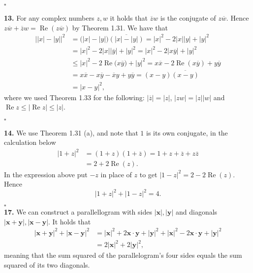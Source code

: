 \documentclass[11pt]{article}
\DeclareMathOperator{\VarRe}{Re}
\begin{document}
\hfill$\square$

\noindent\textbf{13.} For any complex numbers $z, w$ it holds that $\overline{z}w$ is the conjugate of $z\overline{w}$.
Hence $z\overline{w} + \overline{z}w = \VarRe{(z\overline{w})}$ by Theorem 1.31.
We have that
\begin{align*}
  \big| |x| - |y| \big|^2 & =    \big( |x| - |y|\big) \overline{ (|x| - |y| )}
                            =    |x|^2 - 2|x||y| + |y|^2 \\
                          & =    |x|^2 - 2|x||\overline{y}| + |y|^2
                            =    |x|^2 - 2|x\overline{y}| + |y|^2\\
                          & \leq |x|^2 - 2\VarRe{(x\overline{y}}) + |y|^2
                            =    x\overline{x} - 2\VarRe{(x\overline{y})} + y\overline{y} \\
                          & =    x\overline{x} - x\overline{y} - \overline{x}y + y\overline{y}
                            =    (x - y)\overline{(x-y)} \\
                          & =    | x - y |^2,
\end{align*}
where we used Theorem 1.33 for the following: $|\overline{z}| = |z|$, $|zw| = |z||w|$
and $\VarRe{z} \leq |\VarRe{z}| \leq |z|$.

\hfill$\square$


\noindent\textbf{14.} We use Theorem 1.31 (a), and note that $1$ is its own conjugate, in the calculation
below
\begin{align*}
  | 1 + z |^2 & = ( 1 + z ) ( 1 + \overline{z} ) = 1 + z + \overline{z} + z\overline{z} \\
              & = 2 + 2\VarRe{(z)}.
\end{align*}
In the expression above put $-z$ in place of $z$ to get $| 1 - z |^2 = 2 - 2\VarRe{(z)}$.
Hence $$| 1 + z |^2 + | 1 - z |^2 = 4.$$

\hfill$\square$\\

\noindent\textbf{17.} We can construct a  parallellogram with sides $\mathbf{|x|, |y|}$ and diagonals $\mathbf{|x+y|, |x-y|}$.
It holds that
\begin{align*}
  \mathbf{|x+y|}^2 + |\mathbf{x-y}|^2 & = \mathbf{|x|}^2 + 2 \mathbf{x \cdot y} + \mathbf{|y|}^2
                                        + \mathbf{|x|}^2 - 2 \mathbf{x \cdot y} + \mathbf{|y|}^2 \\
                                      & = 2|\mathbf{x}|^2 + 2|\mathbf{y}|^2,
\end{align*}
meaning that the sum squared of the parallelogram's four sides equals the sum squared of its two diagonals.
\end{document}
